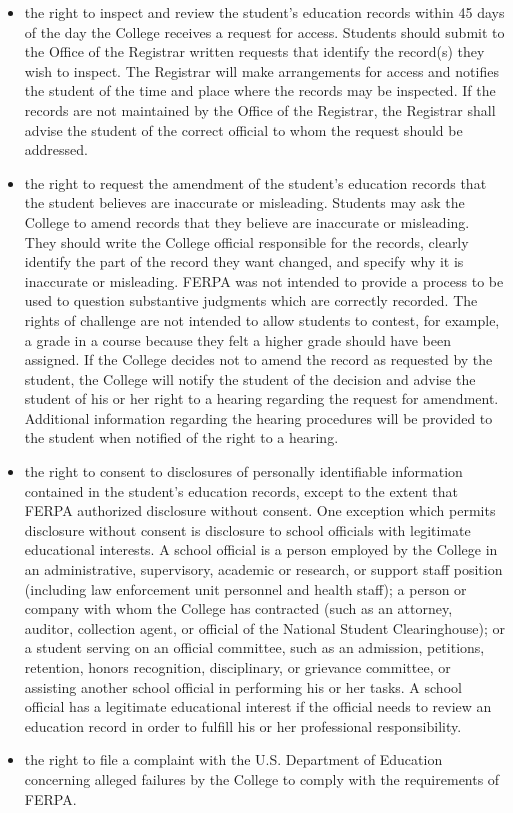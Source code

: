 \documentclass[
  letterpaper,
]{scrbook}
\providecommand{\tightlist}{%
  \setlength{\itemsep}{0pt}\setlength{\parskip}{0pt}}
\begin{document}
\begin{itemize}
\tightlist
\item
  the right to inspect and review the student's education records within
  45 days of the day the College receives a request for access. Students
  should submit to the Office of the Registrar written requests that
  identify the record(s) they wish to inspect. The Registrar will make
  arrangements for access and notifies the student of the time and place
  where the records may be inspected. If the records are not maintained
  by the Office of the Registrar, the Registrar shall advise the student
  of the correct official to whom the request should be addressed.
\item
  the right to request the amendment of the student's education records
  that the student believes are inaccurate or misleading. Students may
  ask the College to amend records that they believe are inaccurate or
  misleading. They should write the College official responsible for the
  records, clearly identify the part of the record they want changed,
  and specify why it is inaccurate or misleading. FERPA was not intended
  to provide a process to be used to question substantive judgments
  which are correctly recorded. The rights of challenge are not intended
  to allow students to contest, for example, a grade in a course because
  they felt a higher grade should have been assigned. If the College
  decides not to amend the record as requested by the student, the
  College will notify the student of the decision and advise the student
  of his or her right to a hearing regarding the request for amendment.
  Additional information regarding the hearing procedures will be
  provided to the student when notified of the right to a hearing.
\item
  the right to consent to disclosures of personally identifiable
  information contained in the student's education records, except to
  the extent that FERPA authorized disclosure without consent. One
  exception which permits disclosure without consent is disclosure to
  school officials with legitimate educational interests. A school
  official is a person employed by the College in an administrative,
  supervisory, academic or research, or support staff position
  (including law enforcement unit personnel and health staff); a person
  or company with whom the College has contracted (such as an attorney,
  auditor, collection agent, or official of the National Student
  Clearinghouse); or a student serving on an official committee, such as
  an admission, petitions, retention, honors recognition, disciplinary,
  or grievance committee, or assisting another school official in
  performing his or her tasks. A school official has a legitimate
  educational interest if the official needs to review an education
  record in order to fulfill his or her professional responsibility.
\item
  the right to file a complaint with the U.S. Department of Education
  concerning alleged failures by the College to comply with the
  requirements of FERPA.
\end{itemize}
\end{document}
